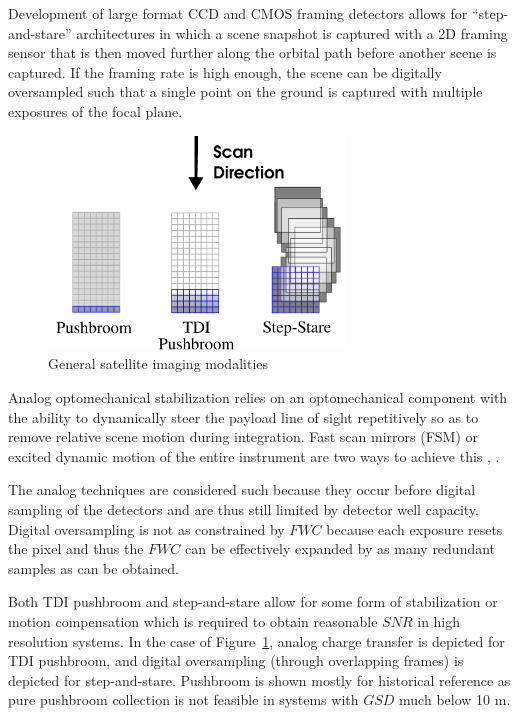 \documentclass[]{spieman}  %
\begin{document}
Development of large format CCD and CMOS framing detectors allows for ``step-and-stare'' architectures in which a scene snapshot is captured with a 2D framing sensor that is then moved further along the orbital path before another scene is captured.  If the framing rate is high enough, the scene can be digitally oversampled such that a single point on the ground is captured with multiple exposures of the focal plane.

\begin{figure}[h!t]
\centering
\includegraphics[width=0.7\textwidth]{figures/modalities.png}
\caption{General satellite imaging modalities}
\label{fig:modalities}
\end{figure}

Analog optomechanical stabilization relies on an optomechanical component with the ability to dynamically steer the payload line of sight repetitively so as to remove relative scene motion during integration.  Fast scan mirrors (FSM) or excited dynamic motion of the entire instrument are two ways to achieve this \cite{patent:jonny}, \cite{patent:dirk}.

The analog techniques are considered such because they occur before digital sampling of the detectors and are thus still limited by detector well capacity.  Digital oversampling is not as constrained by $FWC$ because each exposure resets the pixel and thus the $FWC$ can be effectively expanded by as many redundant samples as can be obtained.

Both TDI pushbroom and step-and-stare allow for some form of stabilization or motion compensation which is required to obtain reasonable $SNR$ in high resolution systems.  In the case of Figure~\ref{fig:modalities}, analog charge transfer is depicted for TDI pushbroom, and digital oversampling (through overlapping frames) is depicted for step-and-stare.  Pushbroom is shown mostly for historical reference as pure pushbroom collection is not feasible in systems with $GSD$ much below 10 m.
\end{document}
